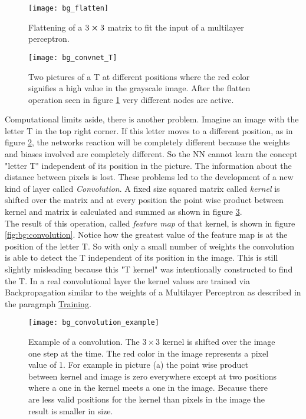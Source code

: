\begin{figure}[H]
    \centering
    \texttt{[image: bg\_flatten]}
    \caption{Flattening of a $3\cp3$ matrix to fit the input of a multilayer perceptron.}
    \label{fig:bg:flatten}
\end{figure}

\begin{figure}[H]
    \centering
    \texttt{[image: bg\_convnet\_T]}
    \caption{Two pictures of a T at different positions where the red color signifies a high value in the grayscale image. After the flatten operation seen in figure \ref{fig:bg:flatten} very different nodes are active.}
    \label{fig:bg:convnet_T}
\end{figure}

\indent
Computational limits aside, there is another problem. Imagine an image with the letter T in the top right corner. If this letter moves to a different position, as in figure \ref{fig:bg:convnet_T}, the networks reaction will be completely different because the weights and biases involved are completely different. So the NN cannot learn the concept "letter T" independent of its position in the picture. The information about the distance between pixels is lost.
These problems led to the development of a new kind of layer called \textit{Convolution}. A fixed size squared matrix called \textit{kernel} is shifted over the matrix and at every position the point wise product between kernel and matrix is calculated and summed as shown in figure \ref{fig:bg:conv_example}.
\\

\indent
The result of this operation, called \textit{feature map} of that kernel, is shown in figure \ref{fig:bg:convolution}. Notice how the greatest value of the feature map is at the position of the letter T. So with only a small number of weights the convolution is able to detect the T independent of its position in the image.
This is still slightly misleading because this "T kernel" was intentionally constructed to find the T. In a real convolutional layer the kernel values are trained via Backpropagation similar to the weights of a Multilayer Perceptron as described in the paragraph \hyperref[par:training]{Training}.
\\

\begin{figure}[H]
    \centering
    \texttt{[image: bg\_convolution\_example]}
    \caption{Example of a convolution. The $3 \times 3$ kernel is shifted over the image one step at the time. The red color in the image represents a pixel value of 1. For example in picture (a) the point wise product between kernel and image is zero everywhere except at two positions where a one in the kernel meets a one in the image. Because there are less valid positions for the kernel than pixels in the image the result is smaller in size.}
    \label{fig:bg:conv_example}
\end{figure}


